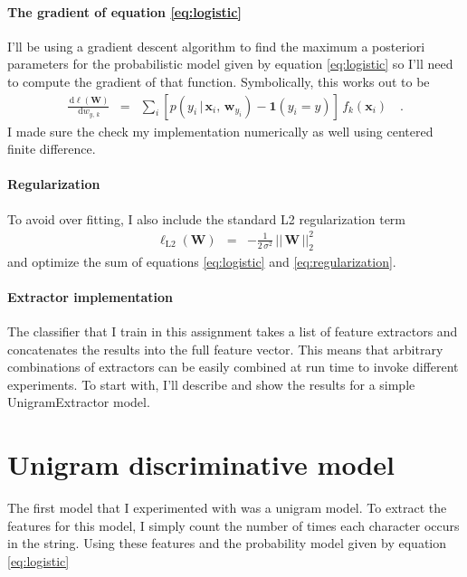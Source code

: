 \documentclass[11pt]{article}
\newcommand{\bvec}[1]{\ensuremath{\boldsymbol{#1}}}
\newcommand{\dd}{\ensuremath{\, \mathrm{d}}}
\newcommand{\code}[1]{{\sffamily #1}}
\begin{document}
\paragraph{The gradient of equation \ref{eq:logistic}}
I'll be using a gradient descent algorithm to find the maximum a posteriori
parameters for the probabilistic model given by equation \ref{eq:logistic} so
I'll need to compute the gradient of that function.
Symbolically, this works out to be
\begin{eqnarray}
\frac{\dd \ell(\bvec{W})}{\dd w_{y,\,k}} &=&
\sum_{i}\left[p(y_i\,|\,\bvec{x}_i,\,\bvec{w}_{y_i})
- \bvec{1}(y_i = y) \right]\,f_k(\bvec{x}_i) \quad.
\end{eqnarray}
I made sure the check my implementation numerically as well using centered
finite difference.

\paragraph{Regularization}
To avoid over fitting, I also include the standard L2 regularization term
\begin{eqnarray}
\label{eq:regularization}
\ell_\mathrm{L2} (\bvec{W}) &=&
-\frac{1}{2\,\sigma^2}\,||\,\bvec{W}\,||_2^2
\end{eqnarray}
and optimize the sum of equations \ref{eq:logistic} and
\ref{eq:regularization}.

\paragraph{Extractor implementation}
The classifier that I train in this assignment takes a list of feature
extractors and concatenates the results into the full feature vector.
This means that arbitrary combinations of extractors can be easily combined at
run time to invoke different experiments.
To start with, I'll describe and show the results for a simple
\code{UnigramExtractor} model.

\section{Unigram discriminative model}

The first model that I experimented with was a unigram model.
To extract the features for this model, I simply count the number of times
each character occurs in the string.
Using these features and the probability model given by equation
\ref{eq:logistic}
\end{document}
